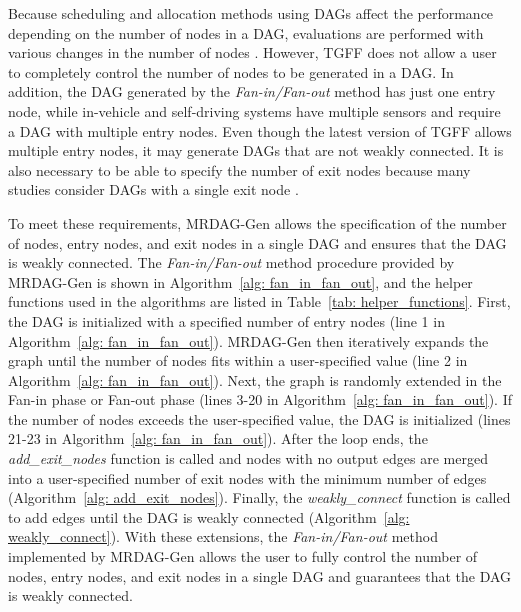 Because scheduling and allocation methods using DAGs affect the performance depending on the number of nodes in a DAG, evaluations are performed with various changes in the number of nodes \cite{senapati2021hmds, tong2020ql}.
However, TGFF does not allow a user to completely control the number of nodes to be generated in a DAG.
In addition, the DAG generated by the {\it Fan-in/Fan-out} method has just one entry node, while in-vehicle and self-driving systems have multiple sensors \cite{verucchi2020latency,guanindustry} and require a DAG with multiple entry nodes.
Even though the latest version of TGFF allows multiple entry nodes, it may generate DAGs that are not weakly connected.
It is also necessary to be able to specify the number of exit nodes because many studies consider DAGs with a single exit node \cite{cho2021conditionally, zhang2020efficient}.

To meet these requirements, MRDAG-Gen allows the specification of the number of nodes, entry nodes, and exit nodes in a single DAG and ensures that the DAG is weakly connected.
The {\it Fan-in/Fan-out} method procedure provided by MRDAG-Gen is shown in Algorithm~\ref{alg: fan_in_fan_out}, and the helper functions used in the algorithms are listed in Table~\ref{tab: helper_functions}.
First, the DAG is initialized with a specified number of entry nodes (line 1 in Algorithm~\ref{alg: fan_in_fan_out}).
MRDAG-Gen then iteratively expands the graph until the number of nodes fits within a user-specified value (line 2 in Algorithm~\ref{alg: fan_in_fan_out}).
Next, the graph is randomly extended in the Fan-in phase or Fan-out phase (lines 3-20 in Algorithm~\ref{alg: fan_in_fan_out}).
If the number of nodes exceeds the user-specified value, the DAG is initialized (lines 21-23 in Algorithm~\ref{alg: fan_in_fan_out}).
After the loop ends, the {\it add\_exit\_nodes} function is called and nodes with no output edges are merged into a user-specified number of exit nodes with the minimum number of edges (Algorithm~\ref{alg: add_exit_nodes}).
Finally, the {\it weakly\_connect} function is called to add edges until the DAG is weakly connected (Algorithm~\ref{alg: weakly_connect}).
With these extensions, the {\it Fan-in/Fan-out} method implemented by MRDAG-Gen allows the user to fully control the number of nodes, entry nodes, and exit nodes in a single DAG and guarantees that the DAG is weakly connected.


